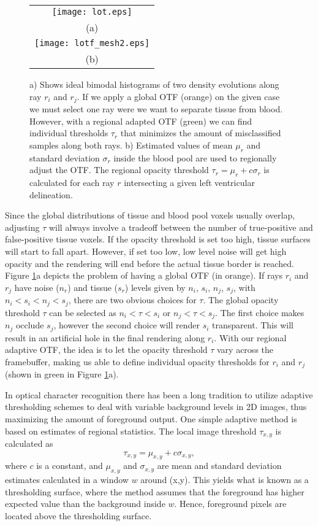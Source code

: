 \begin{figure}  
\begin{center}
\begin{tabular}{c}
\texttt{[image: lot.eps]}\\ 
(a)\\
\texttt{[image: lotf\_mesh2.eps]}\\
(b)
\end{tabular}
\end{center}
\caption[example] { \label{fig:lotf}  a) Shows ideal bimodal histograms of two density evolutions along ray $r_i$ and $r_j$. If we apply a global OTF (orange) on the given case we must select one ray were we want to separate tissue from blood. However, with a regional adapted OTF (green) we can find individual thresholds $\tau_r$ that minimizes the amount of misclassified samples along both rays. b) Estimated values of mean $\mu_r$ and standard deviation $\sigma_r$ inside the blood pool are used to regionally adjust the OTF. The regional opacity threshold $\tau_r = \mu_r + c\sigma_r$ is calculated for each ray $r$ intersecting a given left ventricular delineation.}
\end{figure} 
Since the global distributions of tissue and blood pool voxels usually overlap, adjusting $\tau$ will always involve a tradeoff between 
the number of true-positive and false-positive tissue voxels. If the opacity threshold is set too high, tissue surfaces will start to fall apart. However, if set too low, low level noise will get high opacity and the rendering will end before the actual tissue border is reached. Figure \ref{fig:lotf}a depicts the problem of having a global OTF (in orange). If rays $r_i$ and $r_j$ have noise ($n_r$) and tissue ($s_r$) levels given by $n_i$, $s_i$, $n_j$, $s_j$, with $n_i < s_i < n_j < s_j$, there are two obvious choices for $\tau$. The global opacity threshold $\tau$ can be selected as $n_i < \tau < s_i$ or $n_j < \tau < s_j$. The first choice makes $n_j$ occlude $s_j$, however the second choice will render $s_i$ transparent. This will result in an artificial hole in the final rendering along $r_i$. With our regional adaptive OTF, the idea is to let the opacity threshold $\tau$ vary across the framebuffer, making us able to define individual opacity thresholds for $r_i$ and $r_j$ (shown in green in Figure \ref{fig:lotf}a). 

In optical character recognition there has been a long tradition to utilize adaptive thresholding schemes to deal with variable background levels in 2D images\cite{Niblack1985}, thus maximizing the amount of foreground output. One simple adaptive method is based on estimates of regional statistics. The local image threshold $\tau_{x,y}$ is calculated as
\begin{equation}
\tau_{x,y} = \mu_{x,y} + c\sigma_{x,y},
\label{eq:niblack}
\end{equation}
where $c$ is a constant, and $\mu_{x,y}$ and $\sigma_{x,y}$ are mean and standard deviation estimates calculated in a window $w$ around (x,y). This yields what is known as a thresholding surface, where the method assumes that the foreground has higher expected value than the background inside $w$. Hence, foreground pixels are located above the thresholding surface.
	
